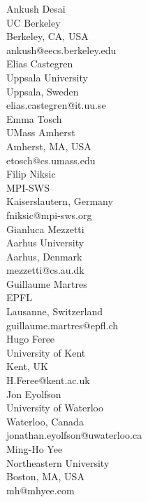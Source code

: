 \documentclass[a4paper,UKenglish]{dartsmaster}
\begin{document}
\begin{participants}
\participant	Ankush Desai	\\	UC Berkeley	\\	Berkeley, CA, USA	\\	ankush@eecs.berkeley.edu	\\

\participant	Elias Castegren	\\	Uppsala University	\\	Uppsala, Sweden	\\	elias.castegren@it.uu.se	\\

\participant	Emma Tosch	\\	UMass Amherst	\\	Amherst, MA, USA	\\	etosch@cs.umass.edu	\\

\participant	Filip Niksic	\\	MPI-SWS	\\	Kaiserslautern, Germany	\\	fniksic@mpi-sws.org	\\

\participant	Gianluca Mezzetti	\\	Aarhus University	\\	Aarhus, Denmark	\\	mezzetti@cs.au.dk	\\

\participant	Guillaume Martres	\\	EPFL	\\	Lausanne, Switzerland	\\	guillaume.martres@epfl.ch	\\

\participant	Hugo Feree	\\	University of Kent	\\	Kent, UK	\\	H.Feree@kent.ac.uk	\\

\participant	Jon Eyolfson	\\	University of Waterloo	\\	Waterloo, Canada	\\	jonathan.eyolfson@uwaterloo.ca	\\

\participant	Ming-Ho Yee	\\	Northeastern University	\\	Boston, MA, USA	\\	mh@mhyee.com	\\


\end{participants}
\end{document}
